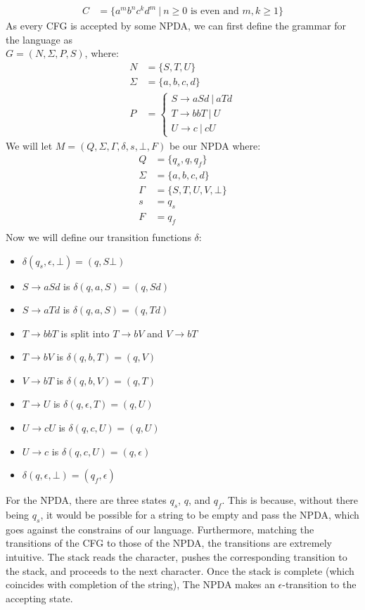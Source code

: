 \documentclass[letterpaper]{article}
\theoremstyle{plain}
\theoremstyle{definition}
\theoremstyle{remark}
\begin{document}
\section{}
\begin{align*}
    C&=\{a^mb^nc^kd^m~|~n\geq0\text{ is even and } m,k\geq1\}
\end{align*}
As every CFG is accepted by some NPDA, we can first define the grammar for the language as \\
$G=(N,\Sigma,P,S)$, where:
\begin{align*}
    N&=\{S,T,U\}\\
    \Sigma&=\{a,b,c,d\}\\
    P&=
    \left\{
    \begin{array}{l}
        S \to aSd~|~aTd \\
        T \to bbT~|~U\\
        U \to c~|~cU
    \end{array}
    \right.
\end{align*}
We will let $M=(Q,\Sigma,\Gamma,\delta,s,\bot,F)$ be our NPDA where:
\begin{align*}
    Q&=\{q_s,q,q_f\}\\
    \Sigma&=\{a,b,c,d\}\\
    \Gamma&=\{S,T,U,V,\bot\}\\
    s&=q_s\\
    F&=q_f\\
\end{align*}
Now we will define our transition functions $\delta$:
\begin{itemize}
    \item $\delta(q_s,\epsilon,\bot)=(q,S\bot)$
    \item $S\to aSd$ is $\delta(q,a,S)=(q,Sd)$
    \item $S\to aTd$ is $\delta(q,a,S)=(q,Td)$
    \item $T\to{bbT}$ is split into $T\to{bV}$ and $V\to{bT}$
    \item $T\to{bV}$ is $\delta(q,b,T)=(q,V)$
    \item $V\to{bT}$ is $\delta(q,b,V)=(q,T)$
    \item $T\to{U}$ is $\delta(q,\epsilon,T)=(q,U)$
    \item $U\to{cU}$ is $\delta(q,c,U)=(q,U)$
    \item $U\to{c}$ is $\delta(q,c,U)=(q,\epsilon)$
    \item $\delta(q,\epsilon,\bot)=(q_f,\epsilon)$
\end{itemize}
For the NPDA, there are three states $q_s$, $q$, and $q_f$. This is because, without there being $q_s$, it would be possible for a string to be empty and pass the NPDA, which goes against the constrains of our language. Furthermore, matching the transitions of the CFG to those of the NPDA, the transitions are extremely intuitive. The stack reads the character, pushes the corresponding transition to the stack, and proceeds to the next character. Once the stack is complete (which coincides with completion of the string), The NPDA makes an $\epsilon$-transition to the accepting state.
\end{document}
